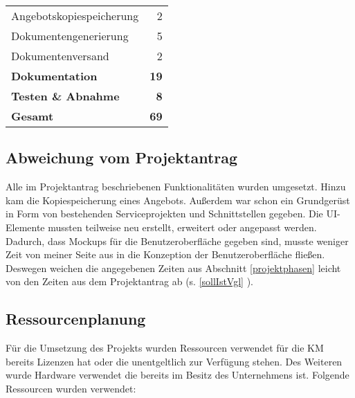 \begin{tabular}{|l|r|}
	\rowcolor{blue!10}Angebotskopiespeicherung                                 &                        2 \\
	\rowcolor{blue!10}Dokumentengenerierung                                    &                        5 \\
	\rowcolor{blue!10}Dokumentenversand                                        &                        2 \\
	\rowcolor{blue!50}\textbf{Dokumentation }                                  &             \textbf{ 19} \\
	\rowcolor{blue!50}\textbf{Testen \& Abnahme }                              &              \textbf{ 8} \\ \hline
	\rowcolor{blue!70}\textbf{Gesamt}                                          &             \textbf{ 69} \\ \hline
\end{tabular}


\subsection{Abweichung vom Projektantrag}
\label{abweichung}
Alle im Projektantrag beschriebenen Funktionalitäten wurden umgesetzt. Hinzu kam die Kopiespeicherung eines Angebots. Außerdem war schon ein Grundgerüst in Form von bestehenden Serviceprojekten und Schnittstellen gegeben. Die UI-Elemente mussten teilweise neu erstellt, erweitert oder angepasst werden.\\
Dadurch, dass Mockups für die Benutzeroberfläche gegeben sind, musste weniger Zeit von meiner Seite aus in die Konzeption der Benutzeroberfläche fließen. Deswegen weichen die angegebenen Zeiten aus Abschnitt \ref{projektphasen} leicht von den Zeiten aus dem Projektantrag ab (s. \ref{sollIstVgl} ). 
\subsection{Ressourcenplanung}
\label{ressourcenplanung}
Für die Umsetzung des Projekts wurden Ressourcen verwendet für die \ac{KM} bereits Lizenzen hat oder die unentgeltlich zur Verfügung stehen. Des Weiteren wurde Hardware verwendet die bereits im Besitz des Unternehmens ist.
Folgende Ressourcen wurden verwendet:

